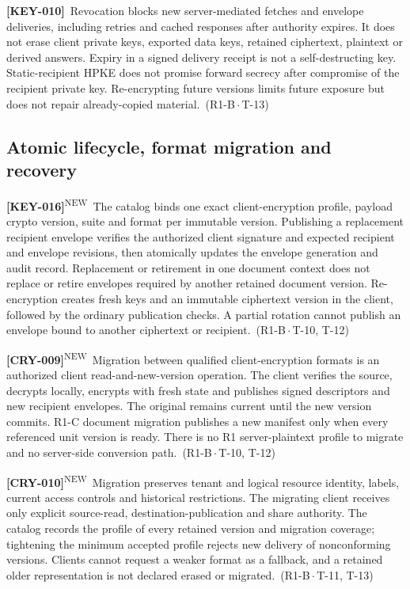 \documentclass[11pt,a4paper]{article}
\newcommand{\reqtag}[2]{{\footnotesize\color{accent}(#1\,$\cdot$\,#2)}}
\newcommand{\req}[4]{\par\noindent\hypertarget{req:#1}{\textbf{[#1]}}\ #4\ \reqtag{#2}{#3}\par}
\newcommand{\reqn}[4]{\par\noindent\hypertarget{req:#1}{\textbf{[#1]}}\textsuperscript{\color{accent}\tiny NEW}\ #4\ \reqtag{#2}{#3}\par}
\begin{document}
\req{KEY-010}{R1-B}{T-13}{Revocation blocks new server-mediated fetches and envelope deliveries, including retries and cached responses after authority expires. It does not erase client private keys, exported data keys, retained ciphertext, plaintext or derived answers. Expiry in a signed delivery receipt is not a self-destructing key. Static-recipient HPKE does not promise forward secrecy after compromise of the recipient private key. Re-encrypting future versions limits future exposure but does not repair already-copied material.}

\subsection{Atomic lifecycle, format migration and recovery}
\reqn{KEY-016}{R1-B}{T-10, T-12}{The catalog binds one exact client-encryption profile, payload crypto version, suite and format per immutable version. Publishing a replacement recipient envelope verifies the authorized client signature and expected recipient and envelope revisions, then atomically updates the envelope generation and audit record. Replacement or retirement in one document context does not replace or retire envelopes required by another retained document version. Re-encryption creates fresh keys and an immutable ciphertext version in the client, followed by the ordinary publication checks. A partial rotation cannot publish an envelope bound to another ciphertext or recipient.}
\reqn{CRY-009}{R1-B}{T-10, T-12}{Migration between qualified client-encryption formats is an authorized client read-and-new-version operation. The client verifies the source, decrypts locally, encrypts with fresh state and publishes signed descriptors and new recipient envelopes. The original remains current until the new version commits. R1-C document migration publishes a new manifest only when every referenced unit version is ready. There is no R1 server-plaintext profile to migrate and no server-side conversion path.}
\reqn{CRY-010}{R1-B}{T-11, T-13}{Migration preserves tenant and logical resource identity, labels, current access controls and historical restrictions. The migrating client receives only explicit source-read, destination-publication and share authority. The catalog records the profile of every retained version and migration coverage; tightening the minimum accepted profile rejects new delivery of nonconforming versions. Clients cannot request a weaker format as a fallback, and a retained older representation is not declared erased or migrated.}
\end{document}
